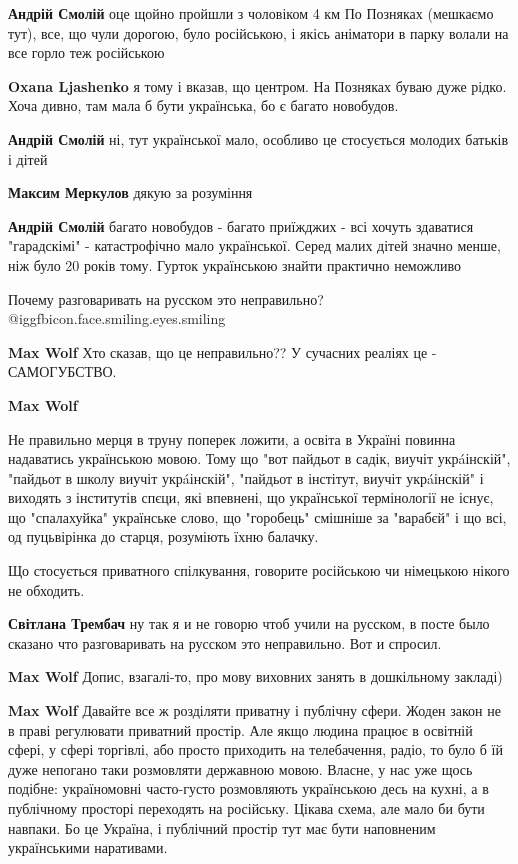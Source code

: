 \begin{itemize}
\begin{itemize}
\textbf{Андрій Смолій} оце щойно пройшли з чоловіком 4 км По Позняках (мешкаємо
тут), все, що чули дорогою, було російською, і якісь аніматори в парку волали
на все горло теж російською


\textbf{Oxana Ljashenko} я тому і вказав, що центром. На Позняках буваю дуже рідко. Хоча дивно, там мала б бути українська, бо є багато новобудов.

\textbf{Андрій Смолій} ні, тут української мало, особливо це стосується молодих батьків і дітей

\textbf{Максим Меркулов} дякую за розуміння

\textbf{Андрій Смолій} багато новобудов - багато приїжджих - всі хочуть здаватися "гарадскімі" - катастрофічно мало української. Серед малих дітей значно менше, ніж було 20 років тому. Гурток українською знайти практично неможливо
\end{itemize} %

Почему разговаривать на русском это неправильно?  @igg{fbicon.face.smiling.eyes.smiling} 

\begin{itemize} %
\textbf{Max Wolf} Хто сказав, що це неправильно?? У сучасних реаліях це - САМОГУБСТВО.

\textbf{Max Wolf} 

Не правильно мерця в труну поперек ложити, а освіта в Україні повинна
надаватись українською мовою. Тому що "вот пайдьот в садік, виучіт укрáінскій",
"пайдьот в школу виучіт укрáінскій", "пайдьот в інстітут, виучіт укрáінскій" і
виходять з інститутів спєци, які впевнені, що української термінології не
існує, що "спалахуйка" українське слово, що "горобець" смішніше за "варабєй" і
що всі, од пуцьвірінка до старця, розуміють їхню балачку.

Що стосується приватного спілкування, говорите російською чи німецькою нікого
не обходить.

\textbf{Світлана Трембач} ну так я и не говорю чтоб учили на русском, в посте было сказано что разговаривать на русском это неправильно.
Вот и спросил.

\textbf{Max Wolf} Допис, взагалі-то, про мову виховних занять в дошкільному закладі)

\textbf{Max Wolf} Давайте все ж розділяти приватну і публічну сфери. Жоден
закон не в праві регулювати приватний простір. Але якщо людина працює в
освітній сфері, у сфері торгівлі, або просто приходить на телебачення, радіо,
то було б їй дуже непогано таки розмовляти державною мовою. Власне, у нас уже
щось подібне: україномовні часто-густо розмовляють українською десь на кухні, а
в публічному просторі переходять на російську. Цікава схема, але мало би бути
навпаки. Бо це Україна, і публічний простір тут має бути наповненим
українськими наративами.



\end{itemize}
\end{itemize}
